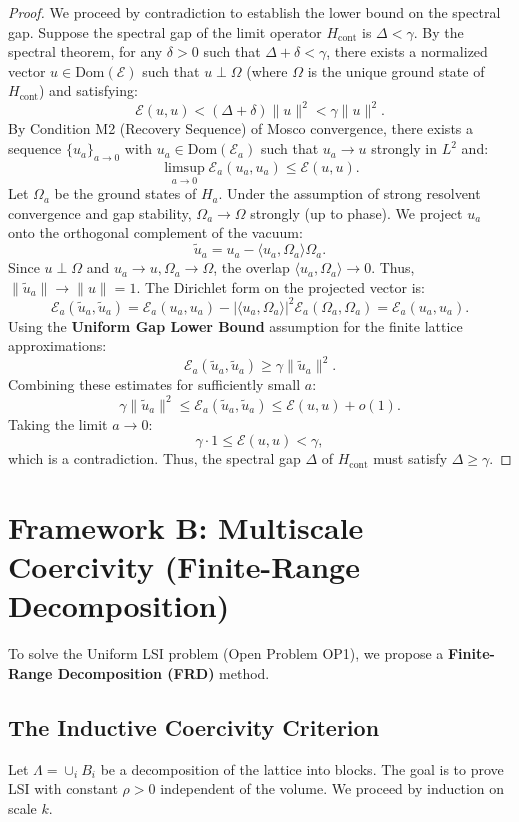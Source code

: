 \begin{proof}
We proceed by contradiction to establish the lower bound on the spectral gap. Suppose the spectral gap of the limit operator $H_{\text{cont}}$ is $\Delta < \gamma$. By the spectral theorem, for any $\delta > 0$ such that $\Delta + \delta < \gamma$, there exists a normalized vector $u \in \text{Dom}(\mathcal{E})$ such that $u \perp \Omega$ (where $\Omega$ is the unique ground state of $H_{\text{cont}}$) and satisfying:
\[
\mathcal{E}(u, u) < (\Delta + \delta) \|u\|^2 < \gamma \|u\|^2.
\]
By Condition M2 (Recovery Sequence) of Mosco convergence, there exists a sequence $\{u_a\}_{a \to 0}$ with $u_a \in \text{Dom}(\mathcal{E}_a)$ such that $u_a \to u$ strongly in $L^2$ and:
\[
\limsup_{a \to 0} \mathcal{E}_a(u_a, u_a) \le \mathcal{E}(u, u).
\]
Let $\Omega_a$ be the ground states of $H_a$. Under the assumption of strong resolvent convergence and gap stability, $\Omega_a \to \Omega$ strongly (up to phase). We project $u_a$ onto the orthogonal complement of the vacuum:
\[
\tilde{u}_a = u_a - \langle u_a, \Omega_a \rangle \Omega_a.
\]
Since $u \perp \Omega$ and $u_a \to u, \Omega_a \to \Omega$, the overlap $\langle u_a, \Omega_a \rangle \to 0$. Thus, $\|\tilde{u}_a\| \to \|u\| = 1$.
The Dirichlet form on the projected vector is:
\[
\mathcal{E}_a(\tilde{u}_a, \tilde{u}_a) = \mathcal{E}_a(u_a, u_a) - |\langle u_a, \Omega_a \rangle|^2 \mathcal{E}_a(\Omega_a, \Omega_a) = \mathcal{E}_a(u_a, u_a).
\]
Using the \textbf{Uniform Gap Lower Bound} assumption for the finite lattice approximations:
\[
\mathcal{E}_a(\tilde{u}_a, \tilde{u}_a) \ge \gamma \|\tilde{u}_a\|^2.
\]
Combining these estimates for sufficiently small $a$:
\[
\gamma \|\tilde{u}_a\|^2 \le \mathcal{E}_a(\tilde{u}_a, \tilde{u}_a) \le \mathcal{E}(u, u) + o(1).
\]
Taking the limit $a \to 0$:
\[
\gamma \cdot 1 \le \mathcal{E}(u, u) < \gamma,
\]
which is a contradiction. Thus, the spectral gap $\Delta$ of $H_{\text{cont}}$ must satisfy $\Delta \ge \gamma$.
\end{proof}

\section{Framework B: Multiscale Coercivity (Finite-Range Decomposition)}
\label{sec:framework-multiscale}

To solve the Uniform LSI problem (Open Problem OP1), we propose a \textbf{Finite-Range Decomposition (FRD)} method.

\subsection{The Inductive Coercivity Criterion}
Let $\Lambda = \cup_i B_i$ be a decomposition of the lattice into blocks.
The goal is to prove LSI with constant $\rho > 0$ independent of the volume.
We proceed by induction on scale $k$.

